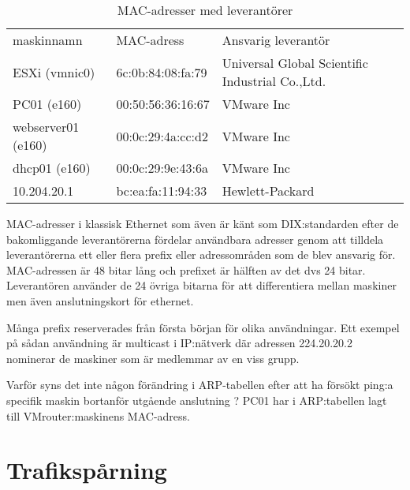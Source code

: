 \documentclass[11pt,a4paper]{article}
\begin{document}
\begin{table}[ht]
  \centering
  \caption{MAC-adresser med leverantörer}
  \begin{tabu}{l l l}
    \toprule
    maskinnamn         &MAC-adress       &Ansvarig leverantör\\
    ESXi (vmnic0)      &6c:0b:84:08:fa:79&Universal Global Scientific Industrial Co.,Ltd.\footnotemark[3]\\
    PC01 (e160)        &00:50:56:36:16:67&VMware Inc\\
    webserver01 (e160) &00:0c:29:4a:cc:d2&VMware Inc\\
    dhcp01 (e160)      &00:0c:29:9e:43:6a&VMware Inc\\
    10.204.20.1        &bc:ea:fa:11:94:33&Hewlett-Packard\footnotemark[4]\\
    \bottomrule
  \end{tabu}
\end{table}

MAC-adresser i klassisk Ethernet som även är känt som DIX:standarden efter
de bakomliggande leverantörerna fördelar användbara adresser genom att tilldela
leverantörerna ett eller flera prefix eller adressområden som de blev ansvarig för. MAC-adressen är 48 bitar lång
och prefixet är hälften av det dvs 24 bitar. Leverantören använder
de 24 övriga bitarna för att differentiera mellan maskiner men även anslutningskort för ethernet.

Många prefix reserverades från första början för olika användningar. Ett exempel på
sådan användning är multicast i IP:nätverk där adressen 224.20.20.2 nominerar
de maskiner som är medlemmar av en viss grupp.

Varför syns det inte någon förändring i ARP-tabellen efter att
ha försökt ping:a specifik maskin bortanför utgående anslutning ?
PC01 har i ARP:tabellen lagt till VMrouter:maskinens MAC-adress.

\section{Trafikspårning}
\label{sec:wireshark_usage}
\end{document}
